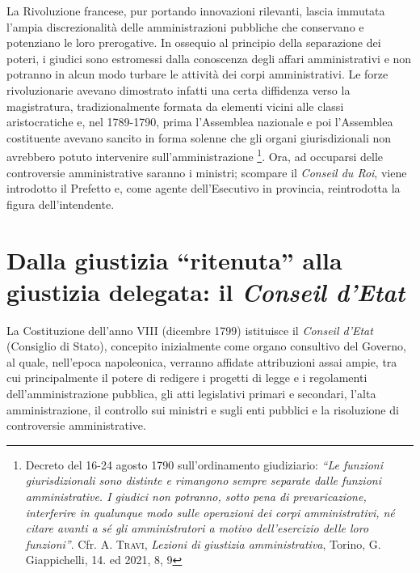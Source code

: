 \documentclass[12pt,it,a4paper,]{report}
\begin{document}
La Rivoluzione francese, pur portando innovazioni rilevanti, lascia
immutata l'ampia discrezionalità delle amministrazioni pubbliche che
conservano e potenziano le loro prerogative. In ossequio al principio
della separazione dei poteri, i giudici sono estromessi dalla conoscenza
degli affari amministrativi e non potranno in alcun modo turbare le
attività dei corpi amministrativi. Le forze rivoluzionarie avevano
dimostrato infatti una certa diffidenza verso la magistratura,
tradizionalmente formata da elementi vicini alle classi aristocratiche
e, nel 1789-1790, prima l'Assemblea nazionale e poi l'Assemblea
costituente avevano sancito in forma solenne che gli organi
giurisdizionali non avrebbero potuto intervenire sull'amministrazione
\footnote{Decreto del 16-24 agosto 1790 sull'ordinamento giudiziario:
  \emph{``Le funzioni giurisdizionali sono distinte e rimangono sempre
  separate dalle funzioni amministrative. I giudici non potranno, sotto
  pena di prevaricazione, interferire in qualunque modo sulle operazioni
  dei corpi amministrativi, né citare avanti a sé gli amministratori a
  motivo dell'esercizio delle loro funzioni''}. Cfr. A. \textsc{Travi},
  \emph{Lezioni di giustizia amministrativa}, Torino, G. Giappichelli,
  14. ed 2021, 8, 9}. Ora, ad occuparsi delle controversie
amministrative saranno i ministri; scompare il \emph{Conseil du Roi},
viene introdotto il Prefetto e, come agente dell'Esecutivo in provincia,
reintrodotta la figura dell'intendente.

\hypertarget{dalla-giustizia-ritenuta-alla-giustizia-delegata-il-conseil-detat}{%
\section{\texorpdfstring{Dalla giustizia ``ritenuta'' alla giustizia
delegata: il \emph{Conseil
d'Etat}}{Dalla giustizia ``ritenuta'' alla giustizia delegata: il Conseil d'Etat}}\label{dalla-giustizia-ritenuta-alla-giustizia-delegata-il-conseil-detat}}

La Costituzione dell'anno VIII (dicembre 1799) istituisce il
\emph{Conseil d'Etat} (Consiglio di Stato), concepito inizialmente come
organo consultivo del Governo, al quale, nell'epoca napoleonica,
verranno affidate attribuzioni assai ampie, tra cui principalmente il
potere di redigere i progetti di legge e i regolamenti
dell'amministrazione pubblica, gli atti legislativi primari e secondari,
l'alta amministrazione, il controllo sui ministri e sugli enti pubblici
e la risoluzione di controversie amministrative.
\end{document}
